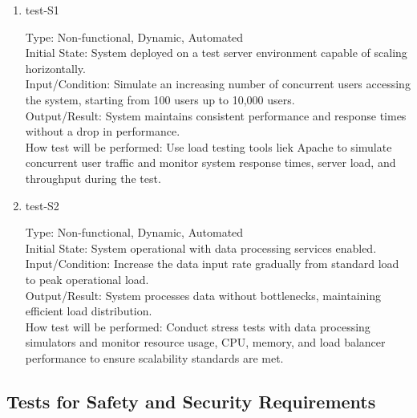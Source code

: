 \documentclass[12pt, titlepage]{article}
\begin{document}
\begin{enumerate}

    \item{test-S1\\} \label{test-S1}
    
    Type: Non-functional, Dynamic, Automated\\
    
    Initial State: System deployed on a test server environment capable of scaling horizontally.\\
    
    Input/Condition: Simulate an increasing number of concurrent users accessing the system, starting from 100 users up to 10,000 users.\\
    
    Output/Result: System maintains consistent performance and response times without a drop in performance.\\
    
    How test will be performed: Use load testing tools liek Apache to simulate concurrent user traffic and monitor system response times, server load, and throughput during the test.
    
    \item{test-S2\\} \label{test-S2}
    
    Type: Non-functional, Dynamic, Automated\\
    
    Initial State: System operational with data processing services enabled.\\
    
    Input/Condition: Increase the data input rate gradually from standard load to peak operational load.\\
    
    Output/Result: System processes data without bottlenecks, maintaining efficient load distribution.\\
    
    How test will be performed: Conduct stress tests with data processing simulators and monitor resource usage, CPU, memory, and load balancer performance to ensure scalability standards are met.
    
\end{enumerate}


\subsection{Tests for Safety and Security Requirements} \label{section:4.3}
\end{document}
